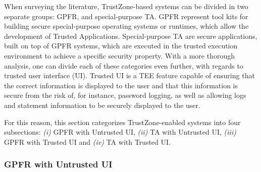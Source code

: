 When surveying the literature, TrustZone-based systems can be divided in two separate groups: \ac{GPFR}, and special-purpose \ac{TA}. \ac{GPFR} represent tool kits for building secure special-purpose operating systems or runtimes, which allow the development of Trusted Applications. Special-purpose \ac{TA} are secure applications, built on top of \ac{GPFR} systems, which are executed in the trusted execution environment to achieve a specific security property. With a more thorough analysis, one can divide each of these categories even further, with regards to trusted user interface (UI). 
Trusted UI is a \ac{TEE} feature capable of ensuring that the correct information is displayed to the user and that this information is secure from the risk of, for instance, password logging, as well as allowing logs and statement information to be securely displayed to the user.



For this reason, this section categorizes TrustZone-enabled systems into four subsections: \emph{(i)} GPFR with Untrusted UI, \emph{(ii)} TA with Untrusted UI, \emph{(iii)} GPFR with Trusted UI and \emph{(iv)} TA with Trusted UI.

\subsubsection{GPFR with Untrusted UI}


